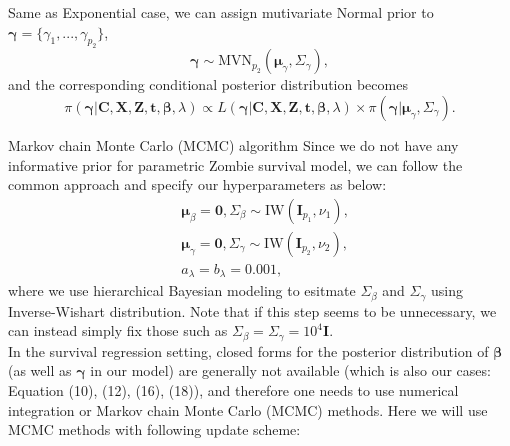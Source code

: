 \documentclass[a4paper, 12pt]{article}
\makeatletter
\renewcommand{\subsection}{\@startsection
	{subsection}    {2}    {0mm}    {-0.5\baselineskip}    {0.01\baselineskip}    {\normalfont\normalsize\itshape\center}}
\makeatother
\begin{document}
Same as Exponential case, we can assign mutivariate Normal prior to $\mathbf{\gamma}=\{\gamma_1,...,\gamma_{p_2}\}$,
\begin{equation}
\mathbf{\gamma} \sim \mbox{MVN}_{p_2}(\mathbf{\mu}_{\gamma}, \Sigma_{\gamma}),
\end{equation}
and the corresponding conditional posterior distribution becomes 
\begin{equation}
\pi(\mathbf{\gamma}|\mathbf{C}, \mathbf{X}, \mathbf{Z}, \mathbf{t}, \mathbf{\beta}, \lambda) \propto L(\mathbf{\gamma}|\mathbf{C}, \mathbf{X}, \mathbf{Z}, \mathbf{t}, \mathbf{\beta}, \lambda)\times \pi(\mathbf{\gamma}|\mathbf{\mu}_{\gamma}, \Sigma_{\gamma}).
\end{equation}
\subsection{Markov chain Monte Carlo (MCMC) algorithm}
\noindent Since we do not have any informative prior for parametric Zombie survival model, we can follow the common approach and specify our hyperparameters as below:  
\begin{equation}
\begin{aligned}
&\mathbf{\mu}_{\beta} = \mathbf{0}, \Sigma_{\beta} \sim \mbox{IW}(\mathbf{I}_{p_1}, \nu_1),\\
& \mathbf{\mu}_{\gamma} = \mathbf{0}, \Sigma_{\gamma} \sim \mbox{IW}(\mathbf{I}_{p_2}, \nu_2), \\
& a_{\lambda} =  b_{\lambda} = 0.001,
\end{aligned}
\end{equation}
where we use hierarchical Bayesian modeling to esitmate $\Sigma_{\beta}$ and $\Sigma_{\gamma}$ using Inverse-Wishart distribution. Note that if this step seems to be unnecessary, we can instead simply fix those such as $\Sigma_{\beta} =\Sigma_{\gamma} = 10^4\mathbf{I}$. \\ \newline
In the survival regression setting, closed forms for the posterior
distribution of $\mathbf{\beta}$ (as well as $\mathbf{\gamma}$ in our model) are generally not available (which is also our cases: Equation (10), (12), (16), (18)), and therefore one needs to use numerical integration or Markov chain Monte Carlo (MCMC) methods. Here we will use MCMC methods with following update scheme:
\end{document}
